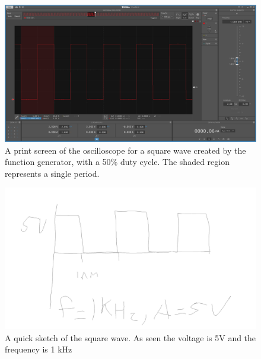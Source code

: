 \documentclass[10pt]{article}
\begin{document}
\begin{center}
		\begin{figure}[H]
			\centering
			\includegraphics[scale = 0.35]{supplemental/squarewave.png}
			\caption{A print screen of the oscilloscope for a square wave created by the function generator, with a 50\% duty cycle. The shaded region represents a single period.}
		\end{figure}
	\begin{figure}[H]
		\centering
		\includegraphics[scale = .8]{supplemental/Eleclabsketch.png}
		\caption{A quick sketch of the square wave. As seen the voltage is 5V and the frequency is 1 kHz}
	\end{figure}
	\end{center}


	
		
	\medskip
	
	
\end{document}
